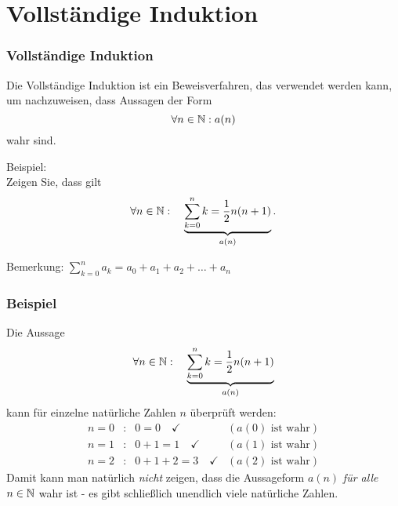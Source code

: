 \documentclass[
				hyperref={pdftex,
						breaklinks,
						pdfauthor={Andreas Weber},
						pdftitle={Logik und Algebra},
						colorlinks=true,
						urlcolor=blue,
						linkcolor=		%
				},
				xcolor=dvipsnames
			]
			{beamer}
\newcommand{\itemColor}{\usebeamercolor[fg]{itemize item}}
\begin{document}
\section{Vollst\"andige Induktion}
%
\begin{frame}\frametitle{Vollst\"andige Induktion}

	Die Vollst\"andige Induktion ist ein Beweisverfahren, das verwendet werden kann, um nachzuweisen, dass Aussagen der Form
	$$
		\forall n\in\mathbb{N} : a(n)	
	$$	
	wahr sind.
	
	\pause
	\vspace{2mm}
	{\itemColor Beispiel:} \\
	Zeigen Sie, dass gilt
	$$
		\forall n\in \mathbb{N}:\quad  \underbrace{\sum_{k=0}^n k = \frac{1}{2}n(n+1)}_{a(n)}.
	$$	
	
	\vfill
	{\scriptsize Bemerkung: $\displaystyle\sum_{k=0}^n a_k = a_0 + a_1 + a_2 + \ldots + a_n$} 
\end{frame}
%
%
\begin{frame}\frametitle{Beispiel}
	Die Aussage
	$$
		\forall n\in \mathbb{N}:\quad  \underbrace{\sum_{k=0}^n k = \frac{1}{2}n(n+1)}_{a(n)}
	$$	
	kann f\"ur einzelne nat\"urliche Zahlen $n$ \"uberpr\"uft werden: 
	$$
		\begin{array}{lcll}
			n=0 	&:& 0=0\quad \checkmark		&(a(0)\text{~ist wahr})		\\
			n=1	&:& 0+1=1\quad \checkmark	&(a(1)\text{~ist wahr})		\\
			n=2	&:& 0+1+2=3\quad \checkmark	&(a(2)\text{~ist wahr})	
		\end{array}
	$$
	\pause
	Damit kann man nat\"urlich {\em nicht} zeigen, 
	dass die Aussageform $a(n)$ {\em f\"ur alle} $n\in\mathbb{N}$ wahr ist - es gibt schlie{\ss}lich unendlich viele nat\"urliche Zahlen.
\end{frame}
%
%
%
\end{document}
